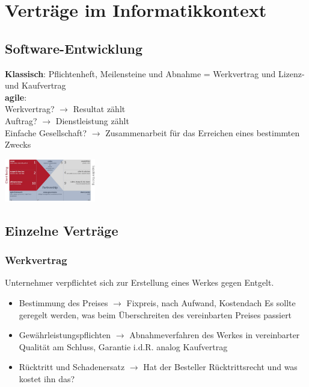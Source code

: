 \documentclass{report}
\newenvironment{Figure}
	{\par\medskip\noindent\minipage{\linewidth}}
	{\endminipage\par\medskip}
\theoremstyle{definition}
\theoremstyle{example}
\begin{document}
\section{Verträge im Informatikkontext}

\subsection{Software-Entwicklung}
\textbf{Klassisch}: Pflichtenheft, Meilensteine und Abnahme = Werkvertrag und Lizenz- und Kaufvertrag\\
\textbf{agile}: \\
Werkvertrag? $\rightarrow$ Resultat zählt\\
Auftrag? $\rightarrow$ Dienstleistung zählt\\
Einfache Gesellschaft? $\rightarrow$ Zusammenarbeit für das Erreichen eines bestimmten Zwecks

\begin{Figure}
   \centering
    \includegraphics[width=150px]{img/agileVertragsgestaltung.png}
        \label{fig:agile Vertragsgestaltung}
\end{Figure}

\subsection{Einzelne Verträge}

\subsubsection{Werkvertrag}
Unternehmer verpflichtet sich zur Erstellung eines Werkes gegen Entgelt.
\begin{itemize}
   \item Bestimmung des Preises $\rightarrow$ Fixpreis, nach Aufwand, Kostendach
   \subitem Es sollte geregelt werden, was beim Überschreiten des vereinbarten Preises passiert 
   \item Gewährleistungspflichten $\rightarrow$ Abnahmeverfahren des Werkes in vereinbarter Qualität am Schluss, Garantie i.d.R. analog Kaufvertrag
   \item Rücktritt und Schadenersatz $\rightarrow$ Hat der Besteller Rücktrittsrecht und was kostet ihn das?
\end{itemize}
\end{document}
